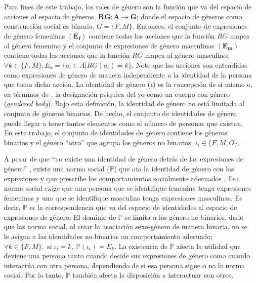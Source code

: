 Para fines de este trabajo, los roles de género son la función que va del espacio de acciones al espacio de géneros, $\mathbf{RG: A \rightarrow G}$; donde el espacio de géneros como construcción social es binario, $G=\{F,M\}$. Entonces, el conjunto de expresiones de género femeninas $(\mathbf{E_f})$ contiene todas las acciones que la función $RG$ mapea al género femenino y el conjunto de expresiones de género masculinas $(\mathbf{E_m})$ contiene todas las acciones que la función $RG$ mapea al género masculino; $\forall k \in \{F, M\}, E_k=\{a_i\in A | RG(a_i)=k  \}$. Note que las acciones son entendidas como expresiones de género de manera independiente a la identidad de la persona que toma dicha acción. 
La identidad de género ($\boldsymbol{\iota}$) es la concepción de si mismo o, en términos de \cite{butler2002gendertrouble}, la designación psíquica del yo como un cuerpo con género (\textit{gendered body}). Bajo esta definición, la identidad de género no está limitada al conjunto de géneros binarios. De hecho, el conjunto de identidades de género puede llegar a tener tantos elementos como el número de personas que existan. En este trabajo, el conjunto de identidades de género contiene los géneros binarios y el género ``otro'' que agrupa los géneros no binarios; $\iota_i \in \{F,M,O\}$.

A pesar de que ``no existe una identidad de género detrás de las expresiones de género'' \citep[p.~25]{butler2002gendertrouble}, existe una norma social ($\boldsymbol{\mathbb{P}}$) que ata la identidad de género con las expresiones y que prescribe los comportamientos socialmente adecuados \citep{akerlof2000economics}. Esa norma social exige que una persona que se identifique femenina tenga expresiones femeninas y una que se identifique masculina tenga expresiones masculinas. Es decir, $\boldsymbol{\mathbb{P}}$ es la correspondencia que va del espacio de identidades al espacio de expresiones de género. El dominio de  $\boldsymbol{\mathbb{P}}$ se limita a los género no binarios, dado que las norma social, al crear la asociación sexo-género de manera binaria, no se le asigna a las identidades no binarias un comportamiento adecuado; $\forall k \in \{F, M\},$ si $\iota_i=k,\ \mathbb{P}(\iota_i)= E_k$.  La existencia de $\mathbf{\mathbb{P}}$ afecta la utilidad que deviene una persona tanto cuando decide sus expresiones de género como cuando interactúa con otra persona, dependiendo de si esa persona sigue o no la norma social. Por lo tanto, $\mathbf{\mathbb{P}}$ también afecta la disposición a interactuar con otros. 

